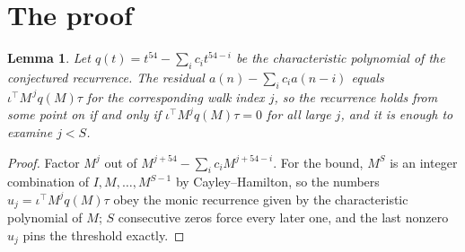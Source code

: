 \documentclass[11pt,a4paper]{article}
\theoremstyle{plain}
\newtheorem{lemma}[theorem]{Lemma}
\theoremstyle{definition}
\begin{document}
\section{The proof}

\begin{lemma}\label{lem:crit}
Let $q(t)=t^{54}-\sum_i c_it^{54-i}$ be the characteristic polynomial of the
conjectured recurrence. The residual $a(n)-\sum_ic_ia(n-i)$ equals
$\iota^{\!\top}M^{\,j}q(M)\tau$ for the corresponding walk index $j$, so the recurrence
holds from some point on if and only if $\iota^{\!\top}M^{j}q(M)\tau=0$ for all large $j$,
and it is enough to examine $j<S$.
\end{lemma}

\begin{proof}
Factor $M^{j}$ out of $M^{j+54}-\sum_ic_iM^{j+54-i}$. For the bound, $M^{S}$
is an integer combination of $I,M,\dots,M^{S-1}$ by Cayley--Hamilton, so the numbers
$u_j=\iota^{\!\top}M^{j}q(M)\tau$ obey the monic recurrence given by the characteristic
polynomial of $M$; $S$ consecutive zeros force every later one, and the last nonzero $u_j$
pins the threshold exactly.
\end{proof}
\end{document}
